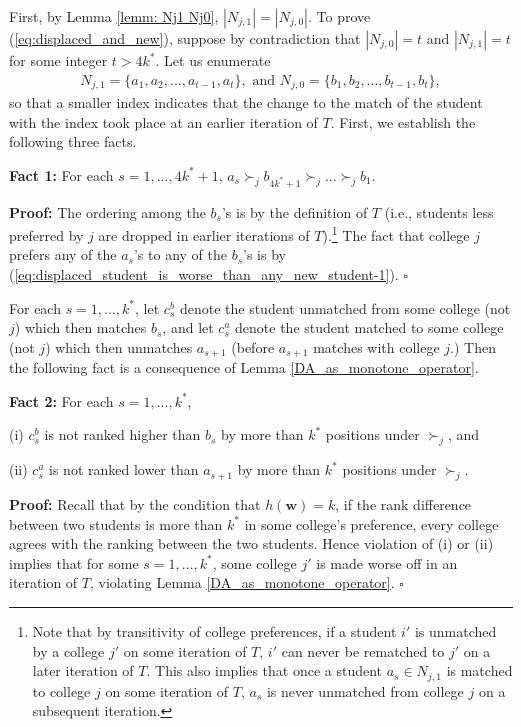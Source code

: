 \documentclass[12pt, fullpage]{amsart}
\theoremstyle{definition}
\theoremstyle{definition}
\theoremstyle{definition}
\begin{document}
\begin{bibunit}[econometrica]
First, by Lemma \ref{lemm: Nj1 Nj0}, $|N_{j,1}| = |N_{j,0}|$. To prove (\ref{eq:displaced_and_new}), suppose by contradiction that $|N_{j,0}|= t$ and $|N_{j,1}|= t$ for some integer $t>4k^{*}$. Let us enumerate
\begin{align*}
	N_{j,1} = \{a_{1},a_{2},...,a_{t-1},a_{t}\}, \text{ and } N_{j,0} = \{b_{1},b_{2},...,b_{t-1},b_{t}\},
\end{align*}
so that a smaller index indicates that the change to the match of the student with the index took place at an earlier iteration of $T$.  First, we establish the following three facts.\medskip

\noindent \textbf{Fact 1: } For each $s=1,...,4k^{*}+1$, $a_{s} \succ_j b_{4k^{*}+1} \succ_j ... \succ_j b_1$.\medskip

\noindent \textbf{Proof: } The ordering among the $b_{s}$'s is by the definition of $T$ (i.e., students less preferred by $j$ are dropped in earlier iterations of $T$).\footnote{Note that by transitivity of college preferences, if a student $i'$ is unmatched by a college $j'$ on some iteration of $T$,  $i'$ can never be rematched to $j'$ on a later iteration of $T$. This also implies that once a student $a_{s}\in N_{j,1}$ is matched to college $j$ on some iteration of $T$, $a_{s}$ is never unmatched from college $j$ on a subsequent iteration.} The fact that college $j$ prefers any of the $a_{s}$'s to any of the $b_{s}$'s is by  (\ref{eq:displaced_student_is_worse_than_any_new_student-1}). $\square$ \medskip 



For each $s=1,...,k^{*}$, let $c_s^b$ denote the student unmatched from some college (not $j$) which then matches $b_s$, and let $c_{s}^a$ denote the student matched to some college (not $j$) which then unmatches $a_{s+1}$ (before $a_{s+1}$ matches with college $j$.) Then the following fact is a consequence of Lemma \ref{DA_as_monotone_operator}.\medskip 

\noindent \textbf{Fact 2: } For each $s=1,...,k^{*}$,

(i) $c_{s}^b$ is not ranked higher than $b_{s}$ by more than $k^{*}$ positions under $\succ_{j}$, and

(ii) $c_{s}^a$ is not ranked lower than $a_{s+1}$ by more than $k^{*}$ positions under $\succ_{j}$.\medskip

\noindent \textbf{Proof: } Recall that by the condition that $h(\boldsymbol{w}) = k$, if the rank difference between two students is more than $k^{*}$ in some college's preference, every college agrees with the ranking between the two students. Hence violation of (i) or (ii) implies that for some $s=1,...,k^{*}$, some college $j'$ is made worse off in an iteration of $T$, violating Lemma \ref{DA_as_monotone_operator}. $\square$\medskip


\end{bibunit}
\end{document}
